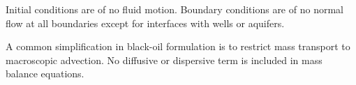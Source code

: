\documentclass[authoryear,preprint,review,11pt]{elsarticle}
\begin{document}
Initial conditions are of no fluid motion. Boundary conditions are of no normal flow at all boundaries except for interfaces with wells or aquifers.

A common simplification in black-oil formulation is to restrict mass transport to macroscopic advection. No diffusive or dispersive term is included in mass balance equations. 


\end{document}
